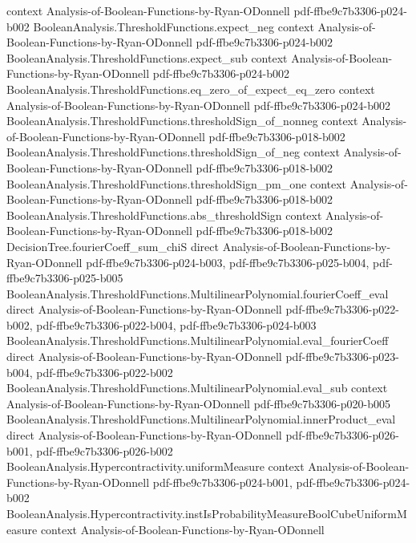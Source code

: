 \begin{theorem}
  {context}
  {Analysis-of-Boolean-Functions-by-Ryan-ODonnell}
  {pdf-ffbe9c7b3306-p024-b002}
\proofstep
  {BooleanAnalysis.ThresholdFunctions.expect_neg}
  {context}
  {Analysis-of-Boolean-Functions-by-Ryan-ODonnell}
  {pdf-ffbe9c7b3306-p024-b002}
\proofstep
  {BooleanAnalysis.ThresholdFunctions.expect_sub}
  {context}
  {Analysis-of-Boolean-Functions-by-Ryan-ODonnell}
  {pdf-ffbe9c7b3306-p024-b002}
\proofstep
  {BooleanAnalysis.ThresholdFunctions.eq_zero_of_expect_eq_zero}
  {context}
  {Analysis-of-Boolean-Functions-by-Ryan-ODonnell}
  {pdf-ffbe9c7b3306-p024-b002}
\proofstep
  {BooleanAnalysis.ThresholdFunctions.thresholdSign_of_nonneg}
  {context}
  {Analysis-of-Boolean-Functions-by-Ryan-ODonnell}
  {pdf-ffbe9c7b3306-p018-b002}
\proofstep
  {BooleanAnalysis.ThresholdFunctions.thresholdSign_of_neg}
  {context}
  {Analysis-of-Boolean-Functions-by-Ryan-ODonnell}
  {pdf-ffbe9c7b3306-p018-b002}
\proofstep
  {BooleanAnalysis.ThresholdFunctions.thresholdSign_pm_one}
  {context}
  {Analysis-of-Boolean-Functions-by-Ryan-ODonnell}
  {pdf-ffbe9c7b3306-p018-b002}
\proofstep
  {BooleanAnalysis.ThresholdFunctions.abs_thresholdSign}
  {context}
  {Analysis-of-Boolean-Functions-by-Ryan-ODonnell}
  {pdf-ffbe9c7b3306-p018-b002}
\proofstep
  {DecisionTree.fourierCoeff_sum_chiS}
  {direct}
  {Analysis-of-Boolean-Functions-by-Ryan-ODonnell}
  {pdf-ffbe9c7b3306-p024-b003,
    pdf-ffbe9c7b3306-p025-b004,
    pdf-ffbe9c7b3306-p025-b005}
\proofstep
  {BooleanAnalysis.ThresholdFunctions.MultilinearPolynomial.fourierCoeff_eval}
  {direct}
  {Analysis-of-Boolean-Functions-by-Ryan-ODonnell}
  {pdf-ffbe9c7b3306-p022-b002,
    pdf-ffbe9c7b3306-p022-b004,
    pdf-ffbe9c7b3306-p024-b003}
\proofstep
  {BooleanAnalysis.ThresholdFunctions.MultilinearPolynomial.eval_fourierCoeff}
  {direct}
  {Analysis-of-Boolean-Functions-by-Ryan-ODonnell}
  {pdf-ffbe9c7b3306-p023-b004,
    pdf-ffbe9c7b3306-p022-b002}
\proofstep
  {BooleanAnalysis.ThresholdFunctions.MultilinearPolynomial.eval_sub}
  {context}
  {Analysis-of-Boolean-Functions-by-Ryan-ODonnell}
  {pdf-ffbe9c7b3306-p020-b005}
\proofstep
  {BooleanAnalysis.ThresholdFunctions.MultilinearPolynomial.innerProduct_eval}
  {direct}
  {Analysis-of-Boolean-Functions-by-Ryan-ODonnell}
  {pdf-ffbe9c7b3306-p026-b001,
    pdf-ffbe9c7b3306-p026-b002}
\proofstep
  {BooleanAnalysis.Hypercontractivity.uniformMeasure}
  {context}
  {Analysis-of-Boolean-Functions-by-Ryan-ODonnell}
  {pdf-ffbe9c7b3306-p024-b001,
    pdf-ffbe9c7b3306-p024-b002}
\proofstep
  {BooleanAnalysis.Hypercontractivity.instIsProbabilityMeasureBoolCubeUniformMeasure}
  {context}
  {Analysis-of-Boolean-Functions-by-Ryan-ODonnell}

\end{theorem}
